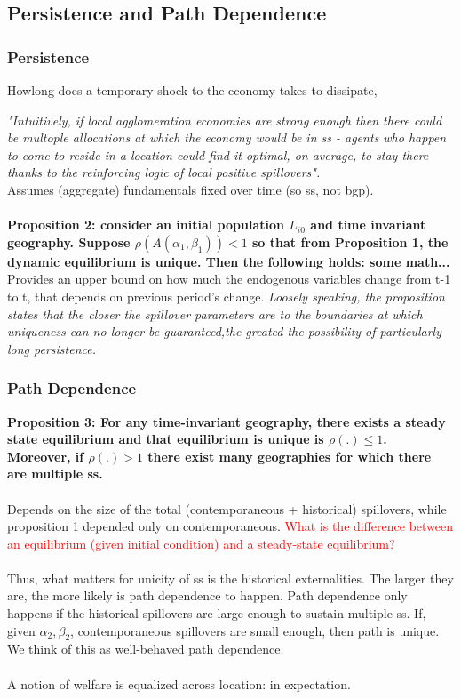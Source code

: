 \documentclass[10pt, final]{article}
\begin{document}
\subsection{Persistence and Path Dependence} %

\subsubsection{Persistence}
Howlong does a temporary shock to the economy takes to dissipate,

\textit{"Intuitively, if local agglomeration economies are strong enough then there could be multople allocations at which the economy would be in ss - agents who happen to come to reside in a location could find it optimal, on average, to stay there thanks to the reinforcing logic of local positive spillovers".}
\\
Assumes (aggregate) fundamentals fixed over time (so ss, not bgp). \\
\\
\textbf{Proposition 2: consider an initial population $L_{i0}$ and time invariant geography. Suppose $\rho(A(\alpha_1, \beta_1)) < 1$ so that from Proposition 1, the dynamic equilibrium is unique. Then the following holds: some math...} Provides an upper bound on how much the endogenous variables change from t-1 to t, that depends on previous period's change. \textit{Loosely speaking, the proposition states that the closer the spillover parameters are to the boundaries at which uniqueness can no longer be guaranteed,the greated the possibility of particularly long persistence.}


\subsubsection{Path Dependence}

\textbf{Proposition 3: For any time-invariant geography, there exists a steady state equilibrium and that equilibrium is unique is $\rho(.) \leq 1$. Moreover, if $\rho(.) > 1$ there exist many geographies for which there are multiple ss.}
\\
\\
Depends on the size of the total (contemporaneous + historical) spillovers, while proposition 1 depended only on contemporaneous. \textcolor{red}{What is the difference between an equilibrium (given initial condition) and a steady-state equilibrium?}
\\
\\
Thus, what matters for unicity of ss is the historical externalities. The larger they are, the more likely is path dependence to happen. Path dependence only happens if the historical spillovers are large enough to sustain multiple ss. If, given $\alpha_2, \beta_2$, contemporaneous spillovers are small enough, then path is unique. We think of this as well-behaved path dependence.
\\
\\ 
A notion of welfare is equalized across location: in expectation.
\\
\\
\end{document}
